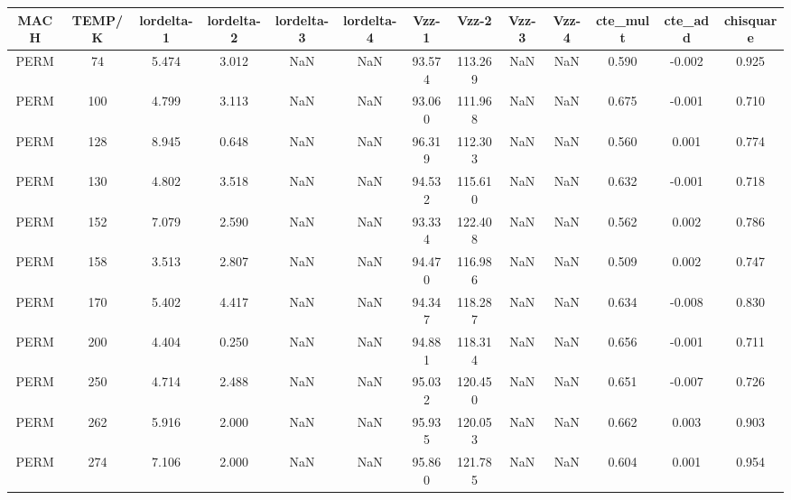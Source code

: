 \begin{table}[h]
	\scriptsize
	\begin{tabular}{ccccccccccccc}
		\hline
		MACH & TEMP/K & lordelta-1 & lordelta-2 & lordelta-3 & lordelta-4 & Vzz-1  & Vzz-2   & Vzz-3   & Vzz-4  & cte\_mult & cte\_add & chisquare \\ \hline
		\rowcolor[HTML]{EFEFEF} 
		PERM & 74     & 5.474      & 3.012      & NaN        & NaN        & 93.574 & 113.269 & NaN     & NaN    & 0.590     & -0.002   & 0.925     \\
		PERM & 100    & 4.799      & 3.113      & NaN        & NaN        & 93.060 & 111.968 & NaN     & NaN    & 0.675     & -0.001   & 0.710     \\
		\rowcolor[HTML]{EFEFEF} 
		PERM & 128    & 8.945      & 0.648      & NaN        & NaN        & 96.319 & 112.303 & NaN     & NaN    & 0.560     & 0.001    & 0.774     \\
		PERM & 130    & 4.802      & 3.518      & NaN        & NaN        & 94.532 & 115.610 & NaN     & NaN    & 0.632     & -0.001   & 0.718     \\
		\rowcolor[HTML]{EFEFEF} 
		PERM & 152    & 7.079      & 2.590      & NaN        & NaN        & 93.334 & 122.408 & NaN     & NaN    & 0.562     & 0.002    & 0.786     \\
		PERM & 158    & 3.513      & 2.807      & NaN        & NaN        & 94.470 & 116.986 & NaN     & NaN    & 0.509     & 0.002    & 0.747     \\
		\rowcolor[HTML]{EFEFEF} 
		PERM & 170    & 5.402      & 4.417      & NaN        & NaN        & 94.347 & 118.287 & NaN     & NaN    & 0.634     & -0.008   & 0.830     \\
		PERM & 200    & 4.404      & 0.250      & NaN        & NaN        & 94.881 & 118.314 & NaN     & NaN    & 0.656     & -0.001   & 0.711     \\
		\rowcolor[HTML]{EFEFEF} 
		PERM & 250    & 4.714      & 2.488      & NaN        & NaN        & 95.032 & 120.450 & NaN     & NaN    & 0.651     & -0.007   & 0.726     \\
		PERM & 262    & 5.916      & 2.000      & NaN        & NaN        & 95.935 & 120.053 & NaN     & NaN    & 0.662     & 0.003    & 0.903     \\
		\rowcolor[HTML]{EFEFEF} 
		PERM & 274    & 7.106      & 2.000      & NaN        & NaN        & 95.860 & 121.785 & NaN     & NaN    & 0.604     & 0.001    & 0.954     \\

\end{tabular}
\end{table}
